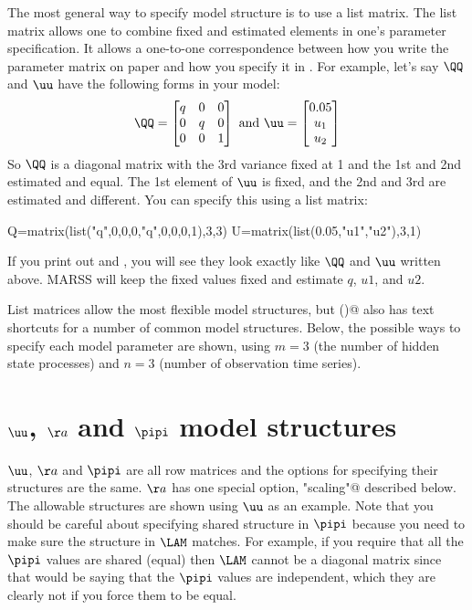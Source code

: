 The most general way to specify model structure is to use a list matrix.  The list matrix allows one to combine fixed and estimated elements in one's parameter specification.  It allows a one-to-one correspondence between how you write the parameter matrix on paper and how you specify it in \R.  For example, let's say $\QQ$ and $\uu$ have the following forms in your model:
\begin{equation*}
\QQ=
\begin{bmatrix}
q&0&0\\
0&q&0\\
0&0&1
\end{bmatrix}
\text{ and }
\uu=
\begin{bmatrix}
0.05\\
u_1\\
u_2
\end{bmatrix}
\end{equation*}
So $\QQ$ is a diagonal matrix with the 3rd variance fixed at 1 and the 1st and 2nd estimated and equal.  The 1st element of $\uu$ is fixed, and the 2nd and 3rd are estimated and different. You can specify this using a list matrix:
 \begin{Schunk}
\begin{Sinput}
Q=matrix(list("q",0,0,0,"q",0,0,0,1),3,3)
U=matrix(list(0.05,"u1","u2"),3,1)
\end{Sinput}
\end{Schunk}
If you print out \verb@Q@ and \verb@U@, you will see they look exactly like $\QQ$ and $\uu$ written above.  MARSS will keep the fixed values fixed and estimate $q$, $u1$, and $u2$.

List matrices allow the most flexible model structures, but \verb@MARSS()@ also has text shortcuts for a number of common model structures.  Below, the possible ways to specify each model parameter are shown, using $m=3$ (the number of hidden state processes) and $n=3$ (number of observation time series).


\section{$\uu$, $\aa$ and $\pipi$ model structures}

$\uu$, $\aa$ and $\pipi$ are all row matrices and the options for specifying their structures are the same.  $\aa$ has one special option, \verb@"scaling"@ described below.  The allowable structures are shown using $\uu$ as an example.   Note that you should be careful about specifying shared structure in $\pipi$ because you need to make sure the structure in $\LAM$ matches.  For example, if you require that all the $\pipi$ values are shared (equal) then $\LAM$ cannot be a diagonal matrix since that would be saying that the $\pipi$ values are independent, which they are clearly not if you force them to be equal.

